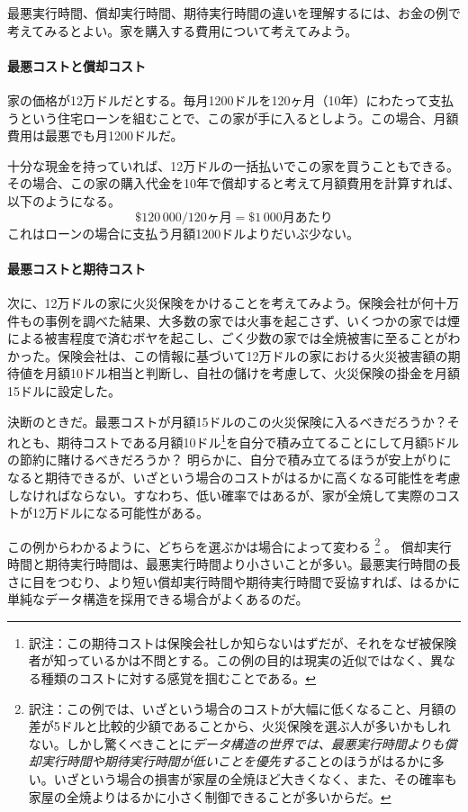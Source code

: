 最悪実行時間、償却実行時間、期待実行時間の違いを理解するには、お金の例で考えてみるとよい。家を購入する費用について考えてみよう。 %

\paragraph{最悪コストと償却コスト}
%
家の価格が12万ドルだとする。毎月1200ドルを120ヶ月（10年）にわたって支払うという住宅ローンを組むことで、この家が手に入るとしよう。この場合、月額費用は最悪でも月1200ドルだ。

十分な現金を持っていれば、12万ドルの一括払いでこの家を買うこともできる。その場合、この家の購入代金を10年で償却すると考えて月額費用を計算すれば、以下のようになる。
\[
   \$120\,000 / 120\text{ヶ月} = \$1\,000\text{月あたり}
\]
これはローンの場合に支払う月額1200ドルよりだいぶ少ない。

\paragraph{最悪コストと期待コスト}
次に、12万ドルの家に火災保険をかけることを考えてみよう。保険会社が何十万件もの事例を調べた結果、大多数の家では火事を起こさず、いくつかの家では煙による被害程度で済むボヤを起こし、ごく少数の家では全焼被害に至ることがわかった。保険会社は、この情報に基づいて12万ドルの家における火災被害額の期待値を月額10ドル相当と判断し、自社の儲けを考慮して、火災保険の掛金を月額15ドルに設定した。

決断のときだ。最悪コストが月額15ドルのこの火災保険に入るべきだろうか？それとも、期待コストである月額10ドル\footnote{訳注：この期待コストは保険会社しか知らないはずだが、それをなぜ被保険者が知っているかは不問とする。この例の目的は現実の近似ではなく、異なる種類のコストに対する感覚を掴むことである。}を自分で積み立てることにして月額5ドルの節約に賭けるべきだろうか？
明らかに、自分で積み立てるほうが安上がりになると期待できるが、いざという場合のコストがはるかに高くなる可能性を考慮しなければならない。すなわち、低い確率ではあるが、家が全焼して実際のコストが12万ドルになる可能性がある。

この例からわかるように、どちらを選ぶかは場合によって変わる
\footnote{訳注：この例では、いざという場合のコストが大幅に低くなること、月額の差が5ドルと比較的少額であることから、火災保険を選ぶ人が多いかもしれない。しかし驚くべきことに\emph{データ構造の世界では、最悪実行時間よりも償却実行時間や期待実行時間が低いことを優先する}ことのほうがはるかに多い。いざという場合の損害が家屋の全焼ほど大きくなく、また、その確率も家屋の全焼よりはるかに小さく制御できることが多いからだ。}
。
償却実行時間と期待実行時間は、最悪実行時間より小さいことが多い。最悪実行時間の長さに目をつむり、より短い償却実行時間や期待実行時間で妥協すれば、はるかに単純なデータ構造を採用できる場合がよくあるのだ。


